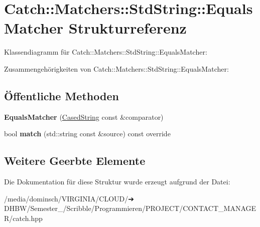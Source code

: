 \hypertarget{structCatch_1_1Matchers_1_1StdString_1_1EqualsMatcher}{}\section{Catch\+:\+:Matchers\+:\+:Std\+String\+:\+:Equals\+Matcher Strukturreferenz}
\label{structCatch_1_1Matchers_1_1StdString_1_1EqualsMatcher}


Klassendiagramm für Catch\+:\+:Matchers\+:\+:Std\+String\+:\+:Equals\+Matcher\+:


Zusammengehörigkeiten von Catch\+:\+:Matchers\+:\+:Std\+String\+:\+:Equals\+Matcher\+:
\subsection*{Öffentliche Methoden}
\begin{DoxyCompactItemize}
\item 
\mbox{\label{structCatch_1_1Matchers_1_1StdString_1_1EqualsMatcher_ab740f1fb2310e9fe3fed5134d4c7e4c8}} 
{\bfseries Equals\+Matcher} (\hyperlink{structCatch_1_1Matchers_1_1StdString_1_1CasedString}{Cased\+String} const \&comparator)
\item 
\mbox{\label{structCatch_1_1Matchers_1_1StdString_1_1EqualsMatcher_a0bb9d64693f7bb1ef7441062d219f21a}} 
bool {\bfseries match} (std\+::string const \&source) const override
\end{DoxyCompactItemize}
\subsection*{Weitere Geerbte Elemente}


Die Dokumentation für diese Struktur wurde erzeugt aufgrund der Datei\+:\begin{DoxyCompactItemize}
\item 
/media/dominsch/\+V\+I\+R\+G\+I\+N\+I\+A/\+C\+L\+O\+U\+D/➔ D\+H\+B\+W/\+Semester\+\_/\+Scribble/\+Programmieren/\+P\+R\+O\+J\+E\+C\+T/\+C\+O\+N\+T\+A\+C\+T\+\_\+\+M\+A\+N\+A\+G\+E\+R/catch.\+hpp\end{DoxyCompactItemize}
